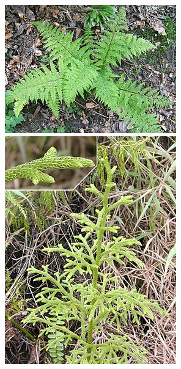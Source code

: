 \documentclass[11pt]{beamer}
\begin{document}
\begin{frame}
\begin{columns}[T]
\begin{figure}
		\end{figure}
		\begin{figure}
			\centering
			\includegraphics[height=0.35\textheight, width=\textwidth]{Ferns.jpg}
			\includegraphics[height=0.35\textheight, width=\textwidth]{Lycopodium_plant.jpg}

\end{figure}
\end{columns}
\end{frame}
\end{document}
